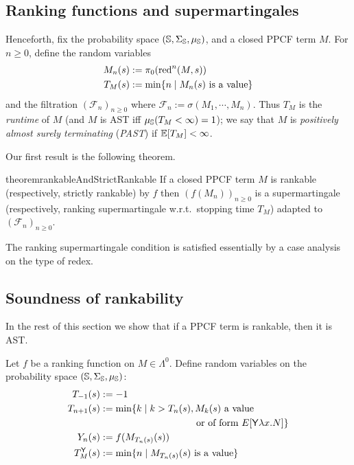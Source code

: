 \subsection{Ranking functions and supermartingales}

Henceforth, fix the probability space $({\mathbb{S}}, \Sigma_{\mathbb{S}}, \mu_{{\mathbb{S}}})$, and a closed PPCF term $M$.
For $n \geq 0$, define the random variables 
\begin{align*}
M_n(s) &:= \pi_0 (\operatorname{red}^n(M, s))\\
T_M(s) &:= \min \{n \mid \hbox{$M_n(s)$ is a value}\}
\end{align*} 
and the filtration $(\mathcal{F}_n)_{n \geq 0}$ where $\mathcal{F}_n := \sigma(M_1, \cdots, M_n)$.
Thus $T_M$ is the \emph{runtime} of $M$ (and $M$ is AST iff $\mu_{{\mathbb{S}}}(T_M < \infty) = 1$); we say that $M$ is \emph{positively almost surely terminating} (\emph{PAST}) if $\mathbb{E}[T_M] < \infty$.

Our first result is the following theorem.
\begin{restatable}{theorem}{rankableAndStrictRankable}
\label{thm:rankable and strict rankable}
If a closed PPCF term $M$ is rankable (respectively, strictly rankable) by $f$ 
then $(f(M_n))_{n \geq 0}$ is a supermartingale (respectively, ranking supermartingale w.r.t.~stopping time $T_M$) adapted to $(\mathcal{F}_n)_{n \geq 0}$. %
\end{restatable}

The ranking supermartingale condition is satisfied essentially by a case analysis on the type of redex.

\subsection{Soundness of rankability}

In the rest of this section we show that if a PPCF term is rankable, then it is AST. 

Let $f$ be a ranking function on $M \in \Lambda^0$.
Define random variables on the probability space $({\mathbb{S}}, \Sigma_{\mathbb{S}}, \mu_{{\mathbb{S}}})$:
\begin{align}
T_{-1}(s) & := -1 \nonumber \\
T_{n+1}(s) & := \min \{ k \mid k>T_n(s), M_k(s) \textrm{ a value} \nonumber\\
& \qquad\qquad\qquad\qquad\qquad \hbox{or of form } E[\tY \lambda x. N] \} \nonumber \\
Y_n(s) & := f(M_{T_n(s)}(s)) \nonumber \\
T_M^\tY(s) &:= \min \set{n \mid M_{T_n(s)}(s) \textrm{ is a value}} \label{eq:y stopping time} 
\end{align}

